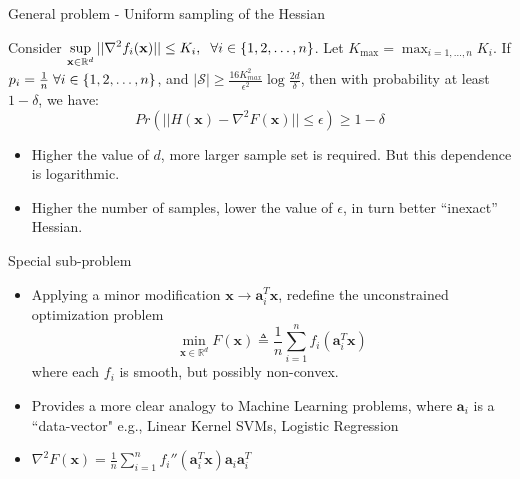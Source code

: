 \documentclass[10pt]{beamer}
\newcommand{\h}{\nabla^{2}}
\newcommand{\xbold}{\mathbf{x}}
\begin{document}
\begin{frame}{General problem - Uniform sampling of the Hessian}
\begin{theorem}
Consider \(\displaystyle \sup_{\xbold\in\mathbb{R}^{d}} ||\h f_{i}(\xbold)|| \leq K_{i}, \hspace{2mm} \forall i \in \{1, 2, \ldots, n\}\). Let \(\displaystyle K_{\max} = \max_{i=1,\ldots, n} K_{i}\). If \(p_{i} = \frac{1}{n} \hspace{1mm} \forall i \in \{1, 2, \ldots, n\}\), and \(|\mathcal{S}| \geq \frac{16K^{2}_{max}}{\epsilon^{2}}\log\frac{2d}{\delta} \), then with probability at least \(1 - \delta\), we have:
\begin{equation}
Pr\left(||H(\xbold) - \h F(\xbold)|| \leq \epsilon\right) \geq 1 - \delta
\end{equation}
\end{theorem}
\pause
{}
\begin{itemize}
\item<3->{Higher the value of \(d\), more larger sample set is required. But this dependence is logarithmic.}
\item<4->{Higher the number of samples, lower the value of \(\epsilon\), in turn better ``inexact'' Hessian.}
\end{itemize}
\end{frame}

\begin{frame}{Special sub-problem}
\begin{itemize}
\item<1->{Applying a minor modification \(\xbold \rightarrow \mathbf{a}_{i}^{T}\xbold\), redefine the unconstrained optimization problem
  \begin{equation}
    \min_{\xbold \in \mathbb{R}^{d}} F(\xbold) \triangleq \frac{1}{n}\displaystyle \sum_{i=1}^{n} f_{i}(\mathbf{a}_{i}^{T}\xbold)
  \end{equation}
where each \(f_{i}\) is smooth, but possibly non-convex.}
\item<2->{Provides a more clear analogy to Machine Learning problems, where \(\mathbf{a}_{i}\) is a ``data-vector" e.g., Linear Kernel SVMs, Logistic Regression}
\item<3->{\(\h F(\xbold) = \frac{1}{n} \displaystyle \sum_{i=1}^{n} f_{i}''(\mathbf{a}_{i}^{T}\xbold) \mathbf{a}_{i}\mathbf{a}_{i}^{T}\)}
\end{itemize}
\end{frame}
\end{document}
